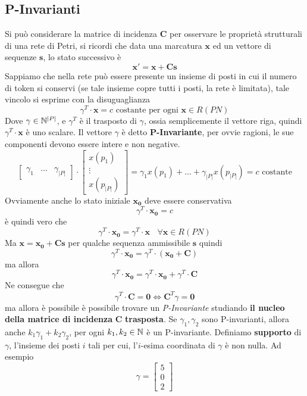 \documentclass[10pt, letterpaper]{report}
\begin{document}
\subsection{P-Invarianti}
Si può considerare la matrice di incidenza $\mathbf C$ per osservare le proprietà strutturali di una rete di Petri, si ricordi che data una marcatura $\mathbf x$ ed un vettore di sequenze $\mathbf s$, lo stato successivo è 
$$ \mathbf x' = \mathbf x + \mathbf C \mathbf s$$
Sappiamo che nella rete può essere presente un insieme di posti in cui il numero di token si conservi (se tale insieme copre tutti i posti, la rete è limitata), tale vincolo si esprime con la disuguaglianza 
$$ \gamma^T\cdot\mathbf x = c \text{ costante per ogni }\mathbf x \in R(PN)$$
Dove $\gamma\in {\mathbb N}^{|P|}$,  e $\gamma^T$ è il trasposto di $\gamma$, ossia semplicemente il vettore riga, quindi $\gamma^T\cdot\mathbf x$ è uno scalare. Il vettore $\gamma$ è detto \textbf{P-Invariante}, per ovvie ragioni, le sue componenti devono essere intere e non negative.
$$ \begin{bmatrix}
    \gamma_1& 
    \dots &
    \gamma_{|P|}
\end{bmatrix}\cdot 
\begin{bmatrix}
    x(p_1)\\ 
    \vdots \\ 
    x(p_{|P|})
\end{bmatrix}=\gamma_1x(p_1)+\dots + \gamma_{|P|}  x(p_{|P|})=c \text{ costante}$$
Ovviamente anche lo stato iniziale $\mathbf{x_0}$ deve essere conservativa 
$$\gamma^T\cdot\mathbf{x_0} = c$$
è quindi vero che 
$$\gamma^T\cdot\mathbf{x_0} =\gamma^T\cdot\mathbf{x} \ \ \ \ \forall \mathbf x\in R(PN)$$
Ma $\mathbf x = \mathbf{x_0}+ \mathbf C \mathbf s$ per qualche sequenza ammissibile $\mathbf s$ quindi 
$$\gamma^T\cdot\mathbf{x_0} =\gamma^T\cdot(\mathbf{x_0}+ \mathbf C)$$
ma allora 
$$\gamma^T\cdot\mathbf{x_0} =\gamma^T\cdot\mathbf{x_0}+\gamma^T\cdot\mathbf C $$
Ne consegue che 
$$ \gamma^T\cdot\mathbf C = \mathbf 0\iff \mathbf C^T\gamma=\mathbf 0$$
ma allora è possibile è possibile trovare un \textit{P-Invariante} studiando \textbf{il nucleo della matrice di incidenza} $\mathbf C$ \textbf{trasposta}.
\acc 
Se $\gamma_1,\gamma_2$ sono P-invarianti, allora anche $k_1\gamma_1+k_2\gamma_2$, per ogni $k_1,k_2\in {\mathbb N}$ è un P-invariante. Definiamo \textbf{supporto} di $\gamma$, l'insieme dei posti $i$ tali per cui, l'$i$-esima coordinata di $\gamma$ è non nulla. Ad esempio 
$$ \gamma=\begin{bmatrix}
    5 \\ 0 \\ 2 
\end{bmatrix}$$
\end{document}
